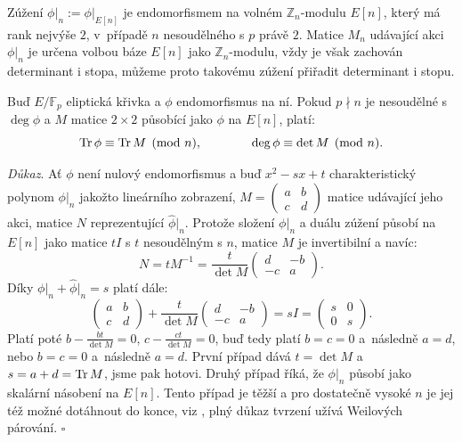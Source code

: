 \documentclass[12pt]{report}
\begin{document}
Zúžení $\phi \vert_n := \phi \vert_{E[n]}$ je endomorfismem na volném $\mathbb{Z}_n$-modulu $E[n]$, který má rank nejvýše $2$, v~případě $n$ nesoudělného s $p$ právě $2$. Matice $M_n$ udávající akci $\phi \vert_n$ je určena volbou báze $E[n]$ jako $\mathbb{Z}_n$-modulu, vždy je však zachován determinant i stopa, můžeme proto takovému zúžení přiřadit determinant i stopu.
\begin{veta}
Buď $E/\mathbb{F}_p$ eliptická křivka a $\phi$ endomorfismus na ní. Pokud $p \nmid n$ je nesoudělné s $\deg \phi$ a $M$ matice $2 \times 2$ působící jako $\phi$ na $E[n]$, platí:
\begin{equation*}
\operatorname{Tr} \phi \equiv \operatorname{Tr} M \pmod{n}, \qquad \qquad \deg \phi \equiv \det M \pmod{n}.
\end{equation*}
\end{veta}
\noindent \textit{Důkaz}. Ať $\phi$ není nulový endomorfismus a buď $x^2 - sx + t$ charakteristický polynom $\phi \vert_n$ jakožto lineárního zobrazení, $M = \begin{pmatrix} a & b\\ c & d \end{pmatrix}$ matice udávající jeho akci, matice $N$ reprezentující $\widehat{\phi} \vert_n$. Protože složení $\phi \vert_n$ a duálu zúžení působí na $E[n]$ jako matice $t I$ s $t$ nesoudělným s $n$, matice $M$ je invertibilní a navíc:
\begin{equation*}
N = t M^{-1} = \frac{t}{\det M} \begin{pmatrix} d & -b\\ -c & a \end{pmatrix}.
\end{equation*} 
Díky $\phi \vert_n + \widehat{\phi} \vert_n = s$ platí dále:
\begin{equation*}
\begin{pmatrix} a & b\\ c & d \end{pmatrix} + \frac{t}{\det M} \begin{pmatrix} d & -b\\ -c & a \end{pmatrix} = sI = \begin{pmatrix} s & 0\\ 0 & s \end{pmatrix}.
\end{equation*}
Platí poté $b - \frac{b t}{\det M} = 0$, $c - \frac{c t}{\det M} = 0$, buď tedy platí $b=c=0$ a~následně $a=d$, nebo $b=c=0$ a~následně $a=d$. První případ dává $t = \det M$ a $s = a+d = \operatorname{Tr} M$, jsme pak hotovi. Druhý případ říká, že $\phi \vert _n$ působí jako skalární násobení na $E[n]$. Tento případ je těžší a pro dostatečně vysoké $n$ je jej též možné dotáhnout do konce, viz \cite[Thm. 7.17]{Sutherland}, plný důkaz tvrzení užívá Weilových párování. \hfill $\square$\\ 
\end{document}
